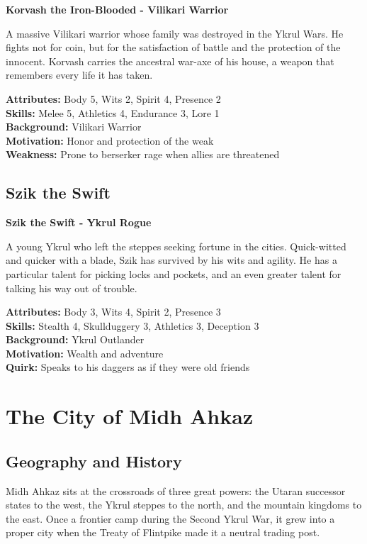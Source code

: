\documentclass[12pt,twoside]{article}
\newenvironment{npcbox}[1]{
  \begin{mdframed}[
    linewidth=1pt,
    linecolor=dungeongray,
    backgroundcolor=white,
    innertopmargin=5pt,
    innerbottommargin=5pt,
    innerrightmargin=5pt,
    innerleftmargin=5pt
  ]
  \textbf{#1}
}{\end{mdframed}}
\begin{document}
\begin{npcbox}{Korvash the Iron-Blooded - Vilikari Warrior}
A massive Vilikari warrior whose family was destroyed in the Ykrul Wars. He fights not for coin, but for the satisfaction of battle and the protection of the innocent. Korvash carries the ancestral war-axe of his house, a weapon that remembers every life it has taken.

\textbf{Attributes:} Body 5, Wits 2, Spirit 4, Presence 2 \\
\textbf{Skills:} Melee 5, Athletics 4, Endurance 3, Lore 1 \\
\textbf{Background:} Vilikari Warrior \\
\textbf{Motivation:} Honor and protection of the weak \\
\textbf{Weakness:} Prone to berserker rage when allies are threatened
\end{npcbox}

\subsection{Szik the Swift}

\begin{npcbox}{Szik the Swift - Ykrul Rogue}
A young Ykrul who left the steppes seeking fortune in the cities. Quick-witted and quicker with a blade, Szik has survived by his wits and agility. He has a particular talent for picking locks and pockets, and an even greater talent for talking his way out of trouble.

\textbf{Attributes:} Body 3, Wits 4, Spirit 2, Presence 3 \\
\textbf{Skills:} Stealth 4, Skullduggery 3, Athletics 3, Deception 3 \\
\textbf{Background:} Ykrul Outlander \\
\textbf{Motivation:} Wealth and adventure \\
\textbf{Quirk:} Speaks to his daggers as if they were old friends
\end{npcbox}

\section{The City of Midh Ahkaz}

\subsection{Geography and History}

Midh Ahkaz sits at the crossroads of three great powers: the Utaran successor states to the west, the Ykrul steppes to the north, and the mountain kingdoms to the east. Once a frontier camp during the Second Ykrul War, it grew into a proper city when the Treaty of Flintpike made it a neutral trading post.
\end{document}
